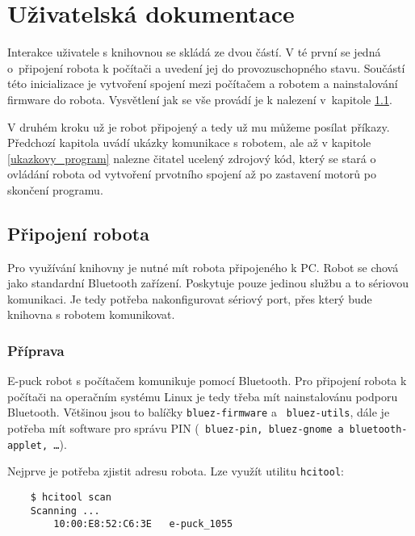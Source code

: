 \chapter{Uživatelská dokumentace}
\label{dokumentace}

    Interakce uživatele s knihovnou se skládá ze dvou částí. V té první se
    jedná o~připojení robota k počítači a uvedení jej do provozuschopného
    stavu. Součástí této inicializace je vytvoření spojení mezi počítačem a
    robotem a nainstalování firmware do robota. Vysvětlení jak se vše provádí
    je k nalezení v~kapitole \ref{pripojeni_robota}.

    V druhém kroku už je robot připojený a tedy už mu můžeme posílat příkazy.
    Předchozí kapitola uvádí ukázky komunikace s robotem, ale až v kapitole
    \ref{ukazkovy_program} nalezne čitatel ucelený zdrojový kód, který se stará
    o ovládání robota od vytvoření prvotního spojení až po zastavení motorů po
    skončení programu.

    \section{Připojení robota}
    \label{pripojeni_robota}

    Pro využívání knihovny je nutné mít robota připojeného k PC. Robot se chová
    jako standardní Bluetooth zařízení. Poskytuje pouze jedinou službu a to
    sériovou komunikaci. Je tedy potřeba nakonfigurovat sériový port, přes
    který bude knihovna s robotem komunikovat.

    \subsection{Příprava}

    E-puck robot s počítačem komunikuje pomocí Bluetooth. Pro připojení robota
    k počítači na operačním systému Linux je tedy třeba mít nainstalovánu
    podporu Bluetooth. Většinou jsou to balíčky {\tt bluez-firmware} a {\tt
    bluez-utils}, dále je potřeba mít software pro správu PIN ({\tt
    bluez-pin, bluez-gnome a~bluetooth-applet, \ldots}).

    Nejprve je potřeba zjistit adresu robota. Lze využít utilitu {\tt hcitool}:

    \begin{verbatim}
    $ hcitool scan
    Scanning ...
        10:00:E8:52:C6:3E	e-puck_1055
    \end{verbatim}

